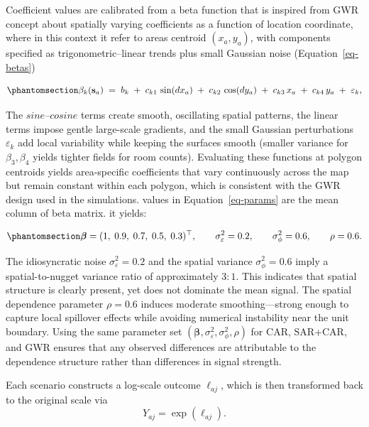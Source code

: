 \documentclass[a4paper,reqno]{amsart}
\begin{document}
Coefficient values are calibrated from a beta function that is inspired
from GWR concept about spatially varying coefficients as a
function of location coordinate, where in this context it refer to areas
centroid \((x_a, y_a)\), with components specified as
trigonometric--linear trends plus small Gaussian noise
(Equation~\ref{eq-betas})

\begin{equation}\phantomsection\label{eq-betas}{
\beta_k(\mathbf s_a)
\;=\;
b_k
\;+\; c_{k1}\,\sin(dx_a)
\;+\; c_{k2}\,\cos(dy_a)
\;+\; c_{k3}\,x_a
\;+\; c_{k4}\,y_a
\;+\; \varepsilon_k ,
}\end{equation}

The \(sine–cosine\) terms create smooth, oscillating spatial patterns,
the linear terms impose gentle large-scale gradients, and the small
Gaussian perturbations \(\varepsilon_k\) add local variability while
keeping the surfaces smooth (smaller variance for \(\beta_3,\beta_4\)
yields tighter fields for room counts). Evaluating these functions at
polygon centroids yields area-specific coefficients that vary
continuously across the map but remain constant within each polygon,
which is consistent with the GWR design used in the simulations.
values in Equation~\ref{eq-params} are the mean column of beta matrix.
it yields:

\begin{equation}\phantomsection\label{eq-params}{
\boldsymbol{\beta}=(1,\;0.9,\;0.7,\;0.5,\;0.3)^\top,\qquad
\sigma_\varepsilon^2=0.2,\qquad
\sigma_\phi^2=0.6,\qquad
\rho=0.6 .
}\end{equation}

The idiosyncratic noise $\sigma_\varepsilon^2 = 0.2$ and the spatial
variance $\sigma_\phi^2 = 0.6$ imply a spatial-to-nugget variance
ratio of approximately $3{:}1$. This indicates that spatial structure is
clearly present, yet does not dominate the mean signal. The spatial
dependence parameter $\rho = 0.6$ induces moderate smoothing—strong
enough to capture local spillover effects while avoiding numerical
instability near the unit boundary. Using the same parameter set
$(\boldsymbol{\beta}, \sigma_\varepsilon^2, \sigma_\phi^2, \rho)$ for
CAR, SAR+CAR, and GWR ensures that any observed differences are
attributable to the dependence structure rather than differences in
signal strength.

Each scenario constructs a log-scale outcome $\ell_{aj}$, which is then
transformed back to the original scale via
\[
Y_{aj} = \exp(\ell_{aj}).
\]
\end{document}
